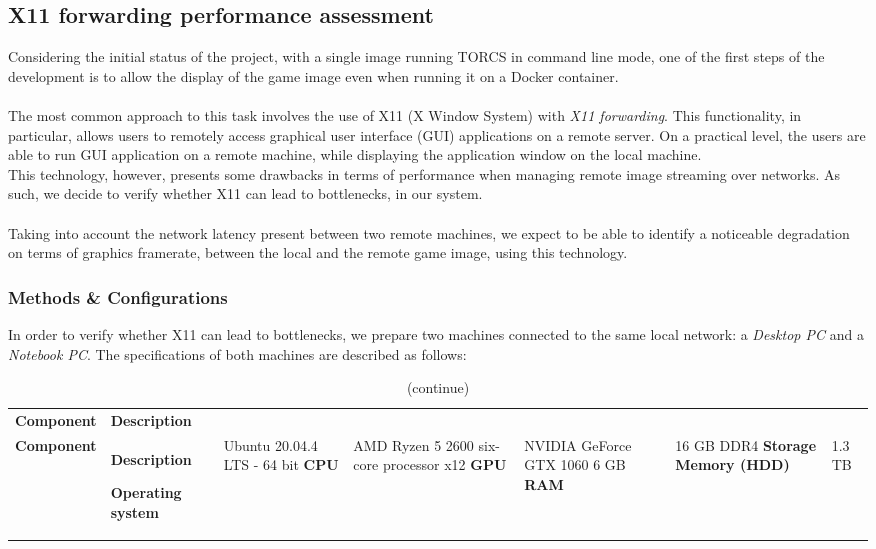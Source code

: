\subsection{X11 forwarding performance assessment} \label{X11-forwarding-assessment-desc}
Considering the initial status of the project, with a single image running TORCS in command line mode, one of the first steps of the development is to allow the display of the game image even when running it on a Docker container. \\ \\
The most common approach to this task involves the use of X11 (X Window System) with \textit{X11 forwarding}. This functionality, in particular, allows users to remotely access graphical user interface (GUI) applications on a remote server. On a practical level, the users are able to run GUI application on a remote machine, while displaying the application window on the local machine. \\
This technology, however, presents some drawbacks in terms of performance when managing remote image streaming over networks. As such, we decide to verify whether X11 can lead to bottlenecks, in our system. \\ \\
Taking into account the network latency present between two remote machines, we expect to be able to identify a noticeable degradation on terms of graphics framerate, between the local and the remote game image, using this technology. 

\subsubsection{Methods \& Configurations}
In order to verify whether X11 can lead to bottlenecks, we prepare two machines connected to the same local network: a \textit{Desktop PC} and a \textit{Notebook PC}. The specifications of both machines are described as follows:

\def\arraystretch{1.75}
\begin{longtable}{ 
		>{\centering}p{} 
		>{\centering}p{}}
	
	
	\caption{Desktop machine specifications} \label{desktop-machine-specifications} \\
	\coloredTableHead
	\textbf{\color{white}Component} & 
	\centering\textbf{\color{white}Description}
	\endfirsthead
	
	\caption[]{(continue)}\\
	\textbf{\color{white}Component} &
	\centering\textbf{\color{white}Description}
	\endhead
	
	\textbf{Operating system} & Ubuntu 20.04.4 LTS - 64 bit \cr
	\textbf{CPU} & AMD Ryzen 5 2600 six-core processor x12 \cr
	\textbf{GPU} & NVIDIA GeForce GTX 1060 6 GB \cr
	\textbf{RAM} & 16 GB DDR4 \cr
	\textbf{Storage Memory (HDD)} & 1.3 TB \cr
\end{longtable}

